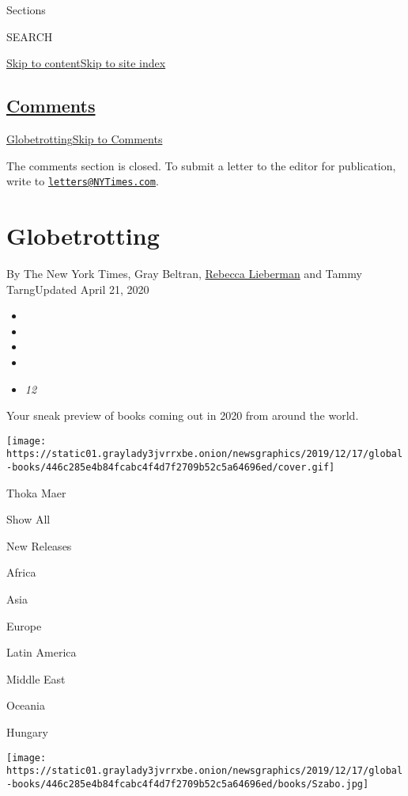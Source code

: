 Sections

SEARCH

\protect\hyperlink{site-content}{Skip to
content}\protect\hyperlink{site-index}{Skip to site index}

\hypertarget{comments}{%
\subsection{\texorpdfstring{\protect\hyperlink{commentsContainer}{Comments}}{Comments}}\label{comments}}

\href{}{Globetrotting}\href{}{Skip to Comments}

The comments section is closed. To submit a letter to the editor for
publication, write to
\href{mailto:letters@NYTimes.com}{\nolinkurl{letters@NYTimes.com}}.

\hypertarget{globetrotting}{%
\section{Globetrotting}\label{globetrotting}}

By The New York Times, Gray Beltran,
\href{https://www.nytimes3xbfgragh.onion/by/rebecca-lieberman}{Rebecca
Lieberman} and Tammy TarngUpdated April 21, 2020

\begin{itemize}
\item
\item
\item
\item
\item
  \emph{12}
\end{itemize}

Your sneak preview of books coming out in 2020 from around the world.

\texttt{[image: https://static01.graylady3jvrrxbe.onion/newsgraphics/2019/12/17/global-books/446c285e4b84fcabc4f4d7f2709b52c5a64696ed/cover.gif]}

Thoka Maer

Show All

New Releases

Africa

Asia

Europe

Latin America

Middle East

Oceania

Hungary

\texttt{[image: https://static01.graylady3jvrrxbe.onion/newsgraphics/2019/12/17/global-books/446c285e4b84fcabc4f4d7f2709b52c5a64696ed/books/Szabo.jpg]}


